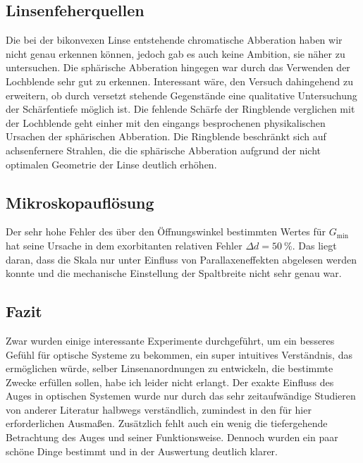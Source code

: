 \subsection{Linsenfeherquellen}
Die bei der bikonvexen Linse entstehende chromatische Abberation haben wir nicht genau erkennen können, jedoch gab es auch keine Ambition, sie näher zu untersuchen. Die sphärische Abberation hingegen war durch das Verwenden der Lochblende sehr gut zu erkennen. Interessant wäre, den Versuch dahingehend zu erweitern, ob durch versetzt stehende Gegenstände eine qualitative Untersuchung der Schärfentiefe möglich ist. Die fehlende Schärfe der Ringblende verglichen mit der Lochblende geht einher mit den eingangs besprochenen physikalischen Ursachen der sphärischen Abberation. Die Ringblende beschränkt sich auf achsenfernere Strahlen, die die sphärische Abberation aufgrund der nicht optimalen Geometrie der Linse deutlich erhöhen.

\subsection{Mikroskopauflösung}
Der sehr hohe Fehler des über den Öffnungswinkel bestimmten Wertes für \(G_{\text{min}}\) hat seine Ursache in dem exorbitanten relativen Fehler \(\Delta d=\qty{50}{\%}\). Das liegt daran, dass die Skala nur unter Einfluss von Parallaxeneffekten abgelesen werden konnte und die mechanische Einstellung der Spaltbreite nicht sehr genau war. 

\subsection{Fazit}
Zwar wurden einige interessante Experimente durchgeführt, um ein besseres Gefühl für optische Systeme zu bekommen, ein super intuitives Verständnis, das ermöglichen würde, selber Linsenanordnungen zu entwickeln, die bestimmte Zwecke erfüllen sollen, habe ich leider nicht erlangt. Der exakte Einfluss des Auges in optischen Systemen wurde nur durch das sehr zeitaufwändige Studieren von anderer Literatur halbwegs verständlich, zumindest in den für hier erforderlichen Ausmaßen. Zusätzlich fehlt auch ein wenig die tiefergehende Betrachtung des Auges und seiner Funktionsweise. Dennoch wurden ein paar schöne Dinge bestimmt und in der Auswertung deutlich klarer.
